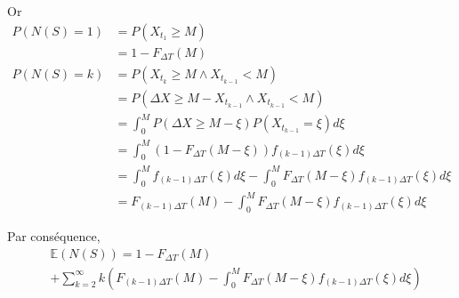 \documentclass[10pt,a4paper]{article}
\begin{document}
Or
\begin{align*}
    P\left( {N\left( S \right) = 1} \right) & = P\left( {{X_{{t_1}}} \geqslant M} \right) \\
    & = 1 - {F_{\Delta T}}\left( M \right) \\
    P\left( {N\left( S \right) = k} \right) & = P\left( {{X_{{t_k}}} \geqslant M \wedge {X_{{t_{k - 1}}}} < M} \right) \\
    & = P\left( {\Delta X \geqslant M - {X_{{t_{k - 1}}}} \wedge {X_{{t_{k - 1}}}} < M} \right) \\
    & = \int_0^M {P\left( {\Delta X \geqslant M - \xi } \right)P\left( {{X_{{t_{k - 1}}}} = \xi } \right)d\xi }\\
    & = \int_0^M {\left( {1 - {F_{\Delta T}}\left( {M - \xi } \right)} \right){f_{\left( {k - 1} \right)\Delta T}}\left( \xi  \right)d\xi } \\
    & = \int_0^M {{f_{\left( {k - 1} \right)\Delta T}}\left( \xi  \right)d\xi }  - \int_0^M {{F_{\Delta T}}\left( {M - \xi } \right){f_{\left( {k - 1} \right)\Delta T}}\left( \xi  \right)d\xi } \\
    & = {F_{\left( {k - 1} \right)\Delta T}}\left( M \right) - \int_0^M {{F_{\Delta T}}\left( {M - \xi } \right){f_{\left( {k - 1} \right)\Delta T}}\left( \xi  \right)d\xi }
\end{align*}

Par conséquence, 
\begin{align}
    \label{e_n_s_de}
    & \mathbb{E}\left( {N\left( S \right)} \right) = 1 - {F_{\Delta T}}\left( M \right) \nonumber \\
    & + \sum\limits_{k = 2}^\infty  {k\left( {{F_{\left( {k - 1} \right)\Delta T}}\left( M \right) - \int_0^M {{F_{\Delta T}}\left( {M - \xi } \right){f_{\left( {k - 1} \right)\Delta T}}\left( \xi  \right)d\xi } } \right)}
\end{align}
\end{document}
